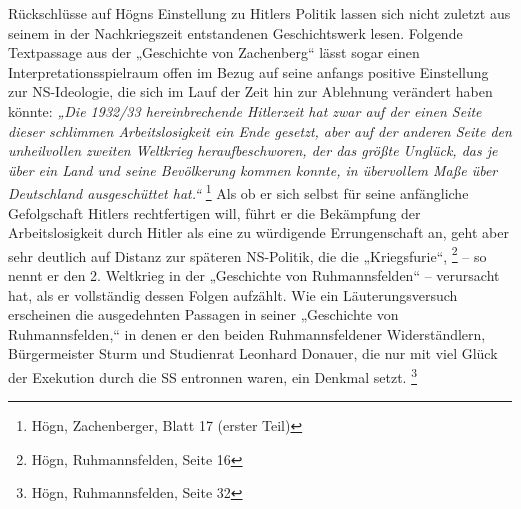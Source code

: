 Rückschlüsse auf Högns Einstellung zu Hitlers Politik lassen sich nicht
zuletzt aus seinem in der Nachkriegszeit entstandenen Geschichtswerk
lesen. Folgende Textpassage aus der „Geschichte von Zachenberg“ lässt
sogar einen Interpretationsspielraum offen im Bezug auf seine anfangs
positive Einstellung zur NS-Ideologie, die sich im Lauf der Zeit hin
zur Ablehnung verändert haben könnte: \textit{„Die 1932/33
hereinbrechende Hitlerzeit hat zwar auf der einen Seite dieser
schlimmen Arbeitslosigkeit ein Ende gesetzt, aber auf der anderen Seite
den unheilvollen zweiten Weltkrieg heraufbeschworen, der das größte
Unglück, das je über ein Land und seine Bevölkerung kommen konnte, in
übervollem Maße über Deutschland ausgeschüttet hat.“ } \footnote{Högn,
Zachenberger, Blatt 17 (erster Teil)}\textit{ }Als ob er sich selbst
für seine anfängliche Gefolgschaft Hitlers rechtfertigen will, führt er
die Bekämpfung der Arbeitslosigkeit durch Hitler als eine zu würdigende
Errungenschaft an, geht aber sehr deutlich auf Distanz zur späteren
NS-Politik, die die „Kriegsfurie“, \footnote{Högn, Ruhmannsfelden,
Seite 16} – so nennt er den 2. Weltkrieg in der „Geschichte von
Ruhmannsfelden“ – verursacht hat, als er vollständig dessen Folgen
aufzählt. Wie ein Läuterungsversuch erscheinen die ausgedehnten
Passagen in seiner „Geschichte von Ruhmannsfelden,“ in denen er den
beiden Ruhmannsfeldener Widerständlern, Bürgermeister Sturm und
Studienrat Leonhard Donauer, die nur mit viel Glück der Exekution durch
die SS entronnen waren, ein Denkmal setzt. \footnote{Högn,
Ruhmannsfelden, Seite 32}


